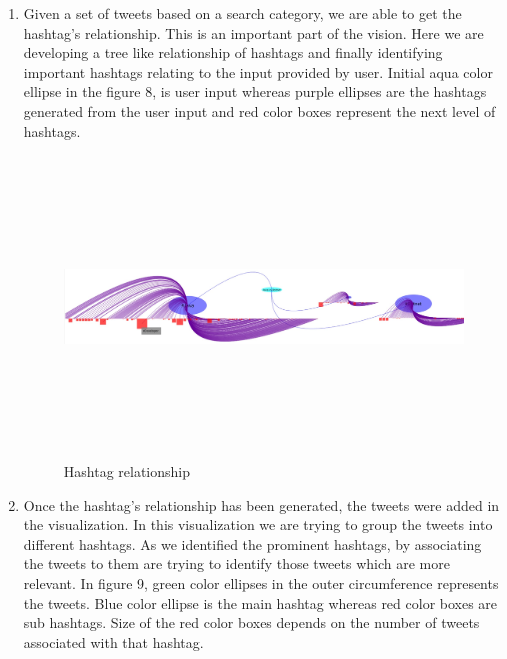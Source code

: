\documentclass[11pt]{article}
\begin{document}
\begin{enumerate}
\item Given a set of tweets based on a search category, we are able to get the hashtag's relationship. This is an important part of the vision. Here we are developing a tree like relationship of hashtags and finally identifying important hashtags relating to the input provided by user. Initial aqua color ellipse in the figure 8, is user input whereas purple ellipses are the hashtags generated from the user input and red color boxes represent the next level of hashtags.
\begin{figure}[h]
\centering
\includegraphics[width=\textwidth, height=8cm]{JustHashTags.jpg}
\caption{Hashtag relationship}
\end{figure}
\item Once the hashtag's relationship has been generated, the tweets were added in the visualization. In this visualization we are trying to group the tweets into different hashtags. As we identified the prominent hashtags, by associating the tweets to them are trying to identify those tweets which are more relevant. In figure 9, green color ellipses in the outer circumference represents the tweets. Blue color ellipse is the main hashtag whereas red color boxes are sub hashtags. Size of the red color boxes depends on the number of tweets associated with that hashtag.


\end{enumerate}
\end{document}
